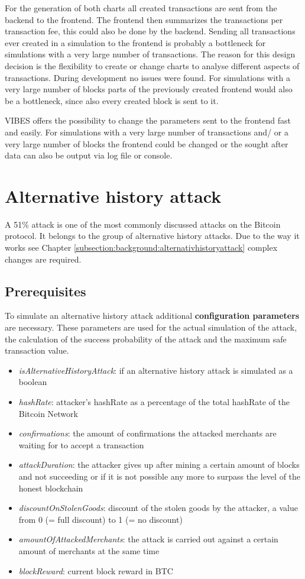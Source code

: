 For the generation of both charts all created transactions are sent from the backend to the frontend. The frontend then summarizes the transactions per transaction fee, this could also be done by the backend. Sending all transactions ever created in a simulation to the frontend is probably a bottleneck for simulations with a very large number of transactions. The reason for this design decision is the flexibility to create or change charts to analyse different aspects of transactions. During development no issues were found. For simulations with a very large number of blocks parts of the previously created frontend would also be a bottleneck, since also every created block is sent to it.

VIBES offers the possibility to change the parameters sent to the frontend fast and easily. For simulations with a very large number of transactions and/ or a very large number of blocks the frontend could be changed or the sought after data can also be output via log file or console.

\section{Alternative history attack}
A 51\% attack is one of the most commonly discussed attacks on the Bitcoin protocol. It belongs to the group of alternative history attacks.  Due to the way it works see Chapter \ref{subsection:background:alternativhistoryattack} complex changes are required.

\subsection{Prerequisites\label{prerequisites}}

To simulate an alternative history attack additional \textbf{configuration parameters} are necessary. These parameters are used for the actual simulation of the attack, the calculation of the success probability of the attack and the maximum safe transaction value.

\begin{itemize}
\item \textit{isAlternativeHistoryAttack}: if an alternative history attack is simulated as a boolean
\item \textit{hashRate}: attacker's hashRate as a percentage of the total hashRate of the Bitcoin Network
\item \textit{confirmations}: the amount of confirmations the attacked merchants are waiting for to accept a transaction
\item \textit{attackDuration}: the attacker gives up after mining a certain amount of blocks and not succeeding or if it is not possible any more to surpass the level of the honest blockchain
\item \textit{discountOnStolenGoods}: discount of the stolen goods by the attacker, a value from 0 (= full discount) to 1 (= no discount)
\item \textit{amountOfAttackedMerchants}: the attack is carried out against a certain amount of merchants at the same time
\item \textit{blockReward}: current block reward in BTC
\end{itemize}

